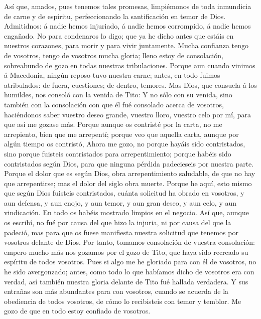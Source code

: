  Así que, amados, pues tenemos tales promesas, limpiémonos
de toda inmundicia de carne y de espíritu, perfeccionando la
santificación en temor de Dios.  Admitidnos: á nadie hemos
injuriado, á nadie hemos corrompido, á nadie hemos engañado.
 No para condenaros lo digo; que ya he dicho antes que
estáis en nuestros corazones, para morir y para vivir juntamente.
 Mucha confianza tengo de vosotros, tengo de vosotros mucha
gloria; lleno estoy de consolación, sobreabundo de gozo en todas
nuestras tribulaciones.  Porque aun cuando vinimos á
Macedonia, ningún reposo tuvo nuestra carne; antes, en todo fuimos
atribulados: de fuera, cuestiones; de dentro, temores.  Mas
Dios, que consuela á los humildes, nos consoló con la venida de Tito:
 Y no sólo con su venida, sino también con la consolación
con que él fué consolado acerca de vosotros, haciéndonos saber vuestro
deseo grande, vuestro lloro, vuestro celo por mí, para que así me gozase
más.  Porque aunque os contristé por la carta, no me
arrepiento, bien que me arrepentí; porque veo que aquella carta, aunque
por algún tiempo os contristó,  Ahora me gozo, no porque
hayáis sido contristados, sino porque fuisteis contristados para
arrepentimiento; porque habéis sido contristados según Dios, para que
ninguna pérdida padecieseis por nuestra parte.  Porque el
dolor que es según Dios, obra arrepentimiento saludable, de que no hay
que arrepentirse; mas el dolor del siglo obra muerte. 
Porque he aquí, esto mismo que según Dios fuisteis contristados, cuánta
solicitud ha obrado en vosotros, y aun defensa, y aun enojo, y aun
temor, y aun gran deseo, y aun celo, y aun vindicación. En todo os
habéis mostrado limpios en el negocio.  Así que, aunque os
escribí, no fué por causa del que hizo la injuria, ni por causa del que
la padeció, mas para que os fuese manifiesta nuestra solicitud que
tenemos por vosotros delante de Dios.  Por tanto, tomamos
consolación de vuestra consolación: empero mucho más nos gozamos por el
gozo de Tito, que haya sido recreado su espíritu de todos vosotros.
 Pues si algo me he gloriado para con él de vosotros, no he
sido avergonzado; antes, como todo lo que habíamos dicho de vosotros era
con verdad, así también nuestra gloria delante de Tito fué hallada
verdadera.  Y sus entrañas son más abundantes para con
vosotros, cuando se acuerda de la obediencia de todos vosotros, de cómo
lo recibisteis con temor y temblor.  Me gozo de que en todo
estoy confiado de vosotros.

